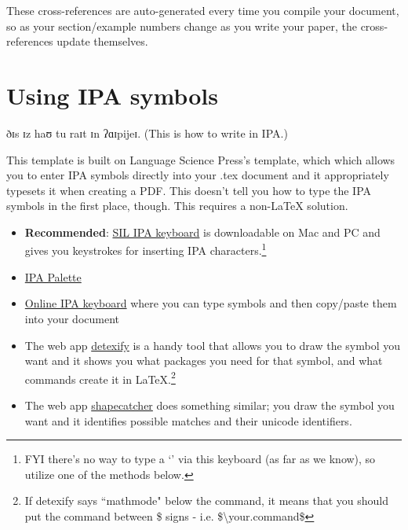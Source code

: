 \documentclass[output=paper,colorlinks,citecolor=brown,
]{langscibook}
\begin{document}
These cross-references are auto-generated every time you compile your document, so as your section/example numbers change as you write your paper, the cross-references update themselves. 

\section{Using IPA symbols} \label{sec:diercks:fonts}

\ea 
ðɪs ɪz haʊ tu raɪt ɪn ʔɑɪpijeɪ. (This is how to write in IPA.)
\z 

\noindent This template is built on Language Science Press's template, which which allows you to enter IPA symbols directly into your .tex document and it appropriately typesets it when creating a PDF. This doesn't tell you how to type the IPA symbols in the first place, though. This requires a non-\LaTeX{} solution.

\begin{itemize}

    \item \textbf{Recommended}: \href{https://scripts.sil.org/cms/scripts/page.php?site_id=nrsi&id=uniipakeyboard}{SIL IPA keyboard} is downloadable on Mac and PC and gives you keystrokes for inserting IPA characters.\footnote{FYI there's no way to type a `\textrhookschwa' via this keyboard (as far as we know), so utilize one of the methods below.}
    
    \item \href{https://www.blugs.com/IPA/}{IPA Palette}
    
    \item \href{https://ipa.typeit.org}{Online IPA keyboard} where you can type symbols and then copy/paste them into your document
    
    \item The web app \href{http://detexify.kirelabs.org/classify.html}{detexify} is a handy tool that allows you to draw the symbol you want and it shows you what packages you need for that symbol, and what commands create it in \LaTeX{}.\footnote{If detexify says ``mathmode" below the command, it means that you should put the command between \$ signs - i.e. \$\backslash your.command\$}
    
    \item The web app \href{https://shapecatcher.com}{shapecatcher} does something similar; you draw the symbol you want and it identifies possible matches and their unicode identifiers.


\end{itemize}
\end{document}
